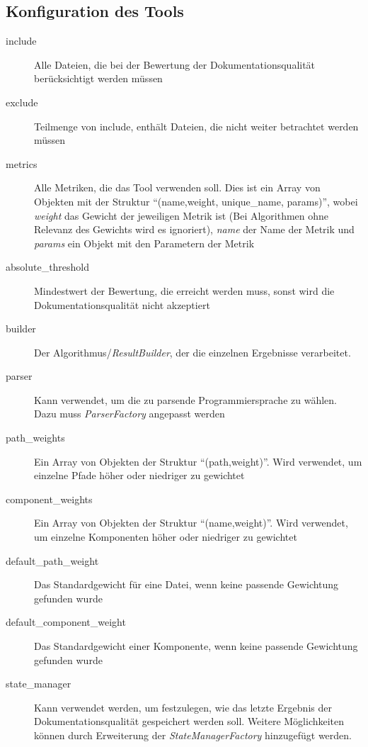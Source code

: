 \begin{appendices}
\chapter{Konfiguration des Tools}
\begin{description}
        \item[include]  Alle Dateien, die bei der Bewertung der Dokumentationsqualität berücksichtigt werden müssen
        \item[exclude]  Teilmenge von include, enthält Dateien, die nicht weiter betrachtet werden müssen
        \item[metrics]  Alle Metriken, die das Tool verwenden soll. Dies ist ein Array von Objekten mit der Struktur \enquote{(name,weight, unique\_name, params)}, wobei \textit{weight} das Gewicht der jeweiligen Metrik ist (Bei Algorithmen ohne Relevanz des Gewichts wird es ignoriert), \textit{name} der Name der Metrik und \textit{params} ein Objekt mit den Parametern der Metrik
        \item[absolute\_threshold] Mindestwert der Bewertung, die erreicht werden muss, sonst wird die Dokumentationsqualität nicht akzeptiert
       
          \item[builder] Der Algorithmus/\textit{ResultBuilder}, der die einzelnen Ergebnisse verarbeitet.
        
        \item[parser]  Kann verwendet, um die zu parsende Programmiersprache zu wählen. Dazu muss \textit{ParserFactory} angepasst werden
        
        \item[path\_weights] Ein Array von Objekten der Struktur \enquote{(path,weight)}. Wird verwendet, um einzelne Pfade höher oder niedriger zu gewichtet
        
         \item[component\_weights] Ein Array von Objekten der Struktur \enquote{(name,weight)}. Wird verwendet, um einzelne Komponenten höher oder niedriger zu gewichtet
         
         \item[default\_path\_weight] Das Standardgewicht für eine Datei, wenn keine passende Gewichtung gefunden wurde
         
         \item[default\_component\_weight] Das Standardgewicht einer Komponente, wenn keine passende Gewichtung gefunden wurde
         
         \item[state\_manager] Kann verwendet werden, um festzulegen, wie das letzte Ergebnis der Dokumentationsqualität gespeichert werden soll. Weitere Möglichkeiten können durch Erweiterung der \textit{StateManagerFactory} hinzugefügt werden.
         

\end{description}
\end{appendices}
